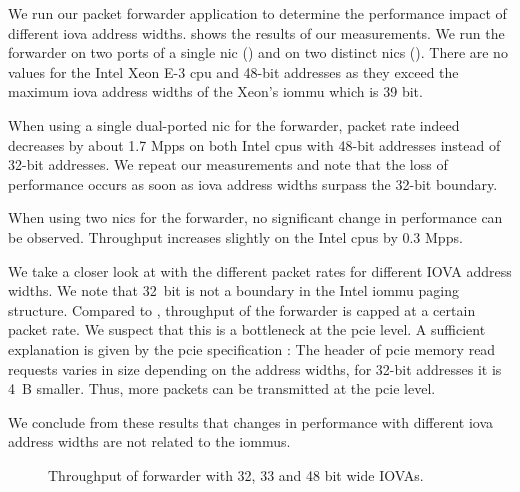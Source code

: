 We run our packet forwarder application to determine the performance impact of
different \ac{iova} address widths. 
shows the results of our measurements. We run the forwarder on two ports of a
single \ac{nic} () and on
two distinct \acp{nic} ().
There are no values for the Intel Xeon E-3 \ac{cpu} and 48-bit addresses as they
exceed the maximum \ac{iova} address widths of the Xeon's \ac{iommu} which is 39
bit.

When using a single dual-ported \ac{nic} for the forwarder, packet rate indeed
decreases by about 1.7 Mpps on both Intel \acp{cpu} with 48-bit addresses
instead of 32-bit addresses. We repeat our measurements and note that the loss
of performance occurs as soon as \ac{iova} address widths surpass the 32-bit
boundary.

When using two \acp{nic} for the forwarder, no significant change in performance
can be observed. Throughput increases slightly on the Intel \acp{cpu} by 0.3
Mpps.

We take a closer look at 
with the different packet rates for different IOVA address widths. We note that
32~bit is not a boundary in the Intel \ac{iommu} paging structure. Compared to
, throughput of the
forwarder is capped at a certain packet rate. We suspect that this is a
bottleneck at the \ac{pcie} level. A sufficient explanation is given by the
\ac{pcie} specification \cite{pcie2017specification}: The header of \ac{pcie}
memory read requests varies in size depending on the address widths, for 32-bit
addresses it is 4~B smaller. Thus, more packets can be transmitted at the
\ac{pcie} level.

We conclude from these results that changes in performance with different
\ac{iova} address widths are not related to the \acp{iommu}.

\begin{figure}%
	\centering

    \caption{Throughput of forwarder with 32, 33 and 48 bit wide IOVAs.}
	\label{fig:iova-address-widths-throughput}
\end{figure}


